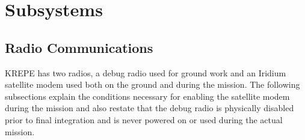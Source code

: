 \documentclass{article}
\begin{document}





\section{Subsystems}
\label{sec:subsystems}

\subsection{Radio Communications}

KREPE has two radios, a debug radio used for ground work and an Iridium satellite modem used both on the ground and during the mission. The following subsections explain the conditions necessary for enabling the satellite modem during the mission and also restate that the debug radio is physically disabled prior to final integration and is never powered on or used during the actual mission.
\end{document}
